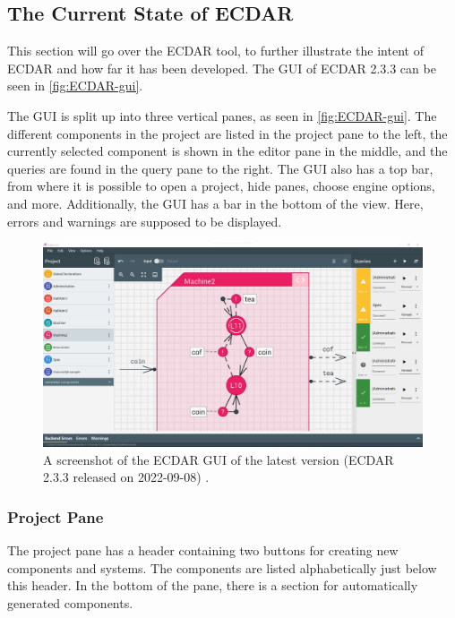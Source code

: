 \subsection{The Current State of ECDAR}\label{sub:the-current-state-of-ecdar} %
This section will go over the ECDAR tool, to further illustrate the intent of ECDAR and how far it has been developed. The GUI of ECDAR 2.3.3 can be seen in \autoref{fig:ECDAR-gui}.

The GUI is split up into three vertical panes, as seen in \autoref{fig:ECDAR-gui}. The different components in the project are listed in the project pane to the left, the currently selected component is shown in the editor pane in the middle, and the queries are found in the query pane to the right.
The GUI also has a top bar, from where it is possible to open a project, hide panes, choose engine options, and more.  
Additionally, the GUI has a bar in the bottom of the view. Here, errors and warnings are supposed to be displayed.

\begin{figure}[H]
    \centering
    \includegraphics[width=1\textwidth]{common/figures/ecdar-overview.jpg}
    \caption{A screenshot of the ECDAR GUI of the latest version (ECDAR 2.3.3 released on 2022-09-08) \cite{ECDARNET_releasenotes}.}
    \label{fig:ECDAR-gui}
\end{figure}

\subsubsection{Project Pane}
The project pane has a header containing two buttons for creating new components and systems. The components are listed alphabetically just below this header. 
In the bottom of the pane, there is a section for automatically generated components.

